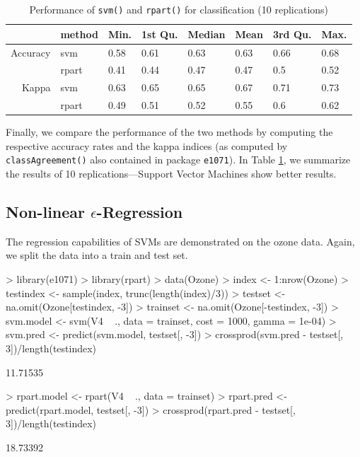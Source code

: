 \documentclass[a4paper]{article}
\newcommand{\pkg}[1]{\texttt{#1}}
\begin{document}

\begin{Schunk}
\begin{table}
\begin{center}
\begin{tabular}{rlllllll}
\hline
 & method & Min. & 1st Qu. & Median & Mean & 3rd Qu. & Max. \\
\hline
Accuracy &   svm & 0.58 & 0.61 & 0.63 & 0.63 & 0.66 & 0.68 \\
 & rpart & 0.41 & 0.44 & 0.47 & 0.47 &  0.5 & 0.52 \\
Kappa &   svm & 0.63 & 0.65 & 0.65 & 0.67 & 0.71 & 0.73 \\
  & rpart & 0.49 & 0.51 & 0.52 & 0.55 &  0.6 & 0.62 \\
\hline
\end{tabular}
\caption{Performance of \texttt{svm()} and
       \texttt{rpart()} for classification (10 replications)}
\label{tab:class}
\end{center}
\end{table}\end{Schunk}
\noindent Finally, we compare the performance of the two methods by computing the 
respective accuracy rates and the kappa indices (as computed by \texttt{classAgreement()}
also contained in package \pkg{e1071}). In Table \ref{tab:class}, we
summarize the results of 10 replications---Support Vector Machines show better results.

\subsection*{Non-linear $\epsilon$-Regression}

The regression capabilities of SVMs are demonstrated on the
ozone data. Again, we split the data
into a train and test set.

\begin{Schunk}
\begin{Sinput}
> library(e1071)
> library(rpart)
> data(Ozone)
> index <- 1:nrow(Ozone)
> testindex <- sample(index, trunc(length(index)/3))
> testset <- na.omit(Ozone[testindex, -3])
> trainset <- na.omit(Ozone[-testindex, -3])
> svm.model <- svm(V4 ~ ., data = trainset, cost = 1000, gamma = 1e-04)
> svm.pred <- predict(svm.model, testset[, -3])
> crossprod(svm.pred - testset[, 3])/length(testindex)
\end{Sinput}
\begin{Soutput}
         [,1]
[1,] 11.71535
\end{Soutput}
\begin{Sinput}
> rpart.model <- rpart(V4 ~ ., data = trainset)
> rpart.pred <- predict(rpart.model, testset[, -3])
> crossprod(rpart.pred - testset[, 3])/length(testindex)
\end{Sinput}
\begin{Soutput}
         [,1]
[1,] 18.73392
\end{Soutput}
\end{Schunk}
\end{document}
